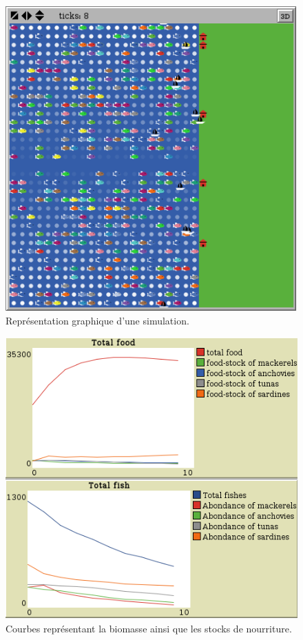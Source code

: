\begin{figure}[h]
  \begin{center}
    \includegraphics[scale=0.50]{img/espace.png}
  \end{center}
  \caption{Représentation graphique d'une simulation.}
  \label{fig:espace}
\end{figure}

\begin{figure}[h]
  \begin{center}
    \includegraphics[scale=0.50]{img/courbes.png}
  \end{center}
  \caption{Courbes représentant la biomasse ainsi que les stocks de nourriture.}
  \label{fig:courbes}
\end{figure}

